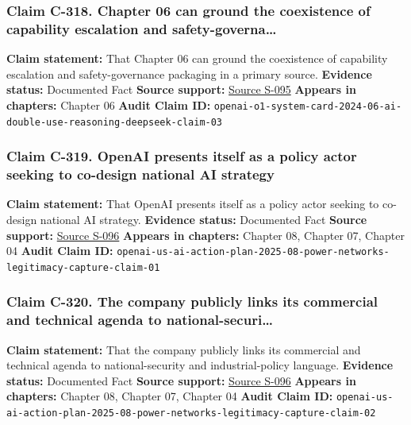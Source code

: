 \documentclass[
  american,
  11pt,
  letterpaper,
]{article}
\begin{document}
\subsubsection{Claim C-318. Chapter 06 can ground the coexistence of
capability escalation and
safety-governa\ldots{}}\label{claim-c-318-chapter-06-can-ground-the-coexistence-of-capability-escalation-and-safety-governa}

\textbf{Claim statement:} That Chapter 06 can ground the coexistence of
capability escalation and safety-governance packaging in a primary
source. \textbf{Evidence status:} Documented Fact \textbf{Source
support:} \hyperref[source-s-095-openai-o1-system-card]{Source S-095}
\textbf{Appears in chapters:} Chapter 06 \textbf{Audit Claim ID:}
\texttt{openai-o1-system-card-2024-06-ai-double-use-reasoning-deepseek-claim-03}

\subsubsection{Claim C-319. OpenAI presents itself as a policy actor
seeking to co-design national AI
strategy}\label{claim-c-319-openai-presents-itself-as-a-policy-actor-seeking-to-co-design-national-ai-strategy}

\textbf{Claim statement:} That OpenAI presents itself as a policy actor
seeking to co-design national AI strategy. \textbf{Evidence status:}
Documented Fact \textbf{Source support:}
\hyperref[source-s-096-openais-proposals-for-the-us-ai-action-plan]{Source
S-096} \textbf{Appears in chapters:} Chapter 08, Chapter 07, Chapter 04
\textbf{Audit Claim ID:}
\texttt{openai-us-ai-action-plan-2025-08-power-networks-legitimacy-capture-claim-01}

\subsubsection{Claim C-320. The company publicly links its commercial
and technical agenda to
national-securi\ldots{}}\label{claim-c-320-the-company-publicly-links-its-commercial-and-technical-agenda-to-national-securi}

\textbf{Claim statement:} That the company publicly links its commercial
and technical agenda to national-security and industrial-policy
language. \textbf{Evidence status:} Documented Fact \textbf{Source
support:}
\hyperref[source-s-096-openais-proposals-for-the-us-ai-action-plan]{Source
S-096} \textbf{Appears in chapters:} Chapter 08, Chapter 07, Chapter 04
\textbf{Audit Claim ID:}
\texttt{openai-us-ai-action-plan-2025-08-power-networks-legitimacy-capture-claim-02}
\end{document}
